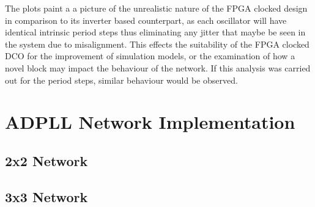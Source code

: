 The plots paint a a picture of the unrealistic nature of the \ac{FPGA} clocked design in comparison to its inverter based counterpart, as each oscillator will have identical intrinsic period steps thus eliminating any jitter that maybe be seen in the system due to misalignment.
This effects the suitability of the FPGA clocked \ac{DCO} for the improvement of simulation models, or the examination of how a novel block may impact the behaviour of the network. If this analysis was carried out for the period steps, similar behaviour would be observed.


\section{\acs{ADPLL} Network Implementation}
\subsection{2x2 Network}
\subsection{3x3 Network}
